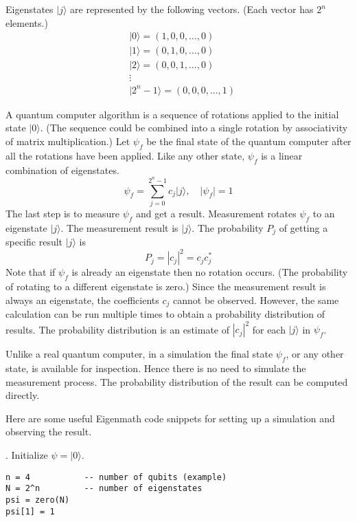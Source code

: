 \bigskip
\noindent
Eigenstates $|j\rangle$ are represented by the following vectors.
(Each vector has $2^n$ elements.)
\begin{align*}
&|0\rangle=(1,0,0,\dots,0)
\\
&|1\rangle=(0,1,0,\ldots,0)
\\
&|2\rangle=(0,0,1,\ldots,0)
\\
&\vdots
\\
&|2^n-1\rangle=(0,0,0,\ldots,1)
\end{align*}

\noindent
A quantum computer algorithm is a sequence of rotations
applied to the initial state $|0\rangle$.
(The sequence could be combined into a single rotation
by associativity of matrix multiplication.)
Let $\psi_f$ be the final state of the quantum computer
after all the rotations have been applied.
Like any other state, $\psi_f$ is a linear combination of eigenstates.
\begin{equation*}
\psi_f=\sum_{j=0}^{2^n-1}c_j|j\rangle,\quad|\psi_f|=1
\end{equation*}
The last step is to measure $\psi_f$ and get a result.
Measurement rotates $\psi_f$ to an eigenstate $|j\rangle$.
The measurement result is $|j\rangle$.
The probability $P_j$ of getting a specific result $|j\rangle$ is
\begin{equation*}
P_j=|c_j|^2=c_jc_j^*
\end{equation*}
Note that if $\psi_f$ is already an eigenstate then no rotation occurs.
(The probability of rotating to a different eigenstate is zero.)
Since the measurement result is always an eigenstate,
the coefficients $c_j$ cannot be observed.
However, the same calculation can be run multiple times
to obtain a probability distribution of results.
The probability distribution is an estimate
of $|c_j|^2$ for each $|j\rangle$ in $\psi_f$.

\bigskip
\noindent
Unlike a real quantum computer, in a simulation
the final state $\psi_f$, or any other state, is available for inspection.
Hence there is no need to simulate the measurement process.
The probability distribution of the result can be computed directly.

\bigskip
\noindent
Here are some useful Eigenmath code snippets for setting up a simulation
and observing the result.

\bigskip
{}. Initialize $\psi=|0\rangle$.
{\color{blue}
\begin{verbatim}
n = 4           -- number of qubits (example)
N = 2^n         -- number of eigenstates
psi = zero(N)
psi[1] = 1
\end{verbatim}}

